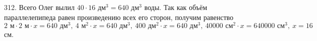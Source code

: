 312. Всего Олег вылил $40\cdot16\text{ дм}^3=640\text{ дм}^3$ воды. Так как объём параллелепипеда равен произведению всех его сторон, получим равенство $2\text{ м}\cdot2\text{ м}\cdot x=640\text{ дм}^3,\ 4\text{ м}^2\cdot x=640\text { дм}^3,\ 400\text{ дм}^2\cdot x=640\text { дм}^3,\
40000\text{ см}^2\cdot x=640000\text { см}^3,\ x=16$см.\\
